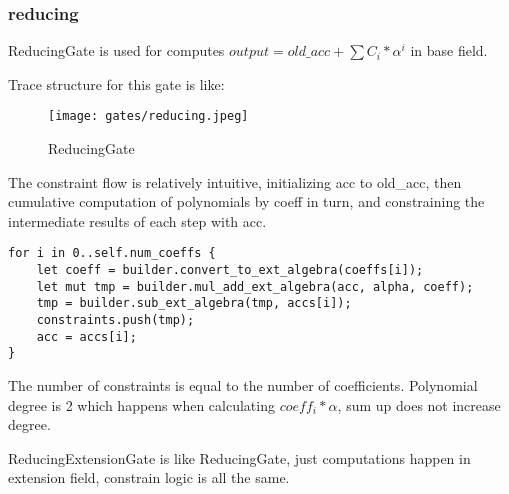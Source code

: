 \subsubsection{reducing}

ReducingGate is used for computes $output = old\_acc + \sum C_i*\alpha^i$ in base field.

Trace structure for this gate is like:

\begin{figure}[!ht]
    \centering
    \texttt{[image: gates/reducing.jpeg]}
    \caption{ReducingGate}
    \label{fig:reducing}
\end{figure}

The constraint flow is relatively intuitive, initializing acc to old\_acc, then cumulative computation of polynomials by coeff in turn, 
and constraining the intermediate results of each step with acc.

\begin{lstlisting}
for i in 0..self.num_coeffs {
    let coeff = builder.convert_to_ext_algebra(coeffs[i]);
    let mut tmp = builder.mul_add_ext_algebra(acc, alpha, coeff);
    tmp = builder.sub_ext_algebra(tmp, accs[i]);
    constraints.push(tmp);
    acc = accs[i];
}
\end{lstlisting}

The number of constraints is equal to the number of coefficients. Polynomial degree is 2 which happens when calculating $coeff_i * \alpha$, sum up does not increase degree.

ReducingExtensionGate is like ReducingGate, just computations happen in extension field, constrain logic is all the same.